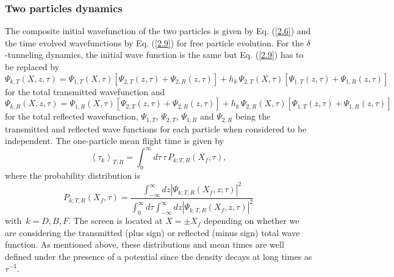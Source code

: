 \documentclass[preprint,aps]{revtex4}
\begin{document}
\subsubsection{Two particles dynamics}

The composite initial wavefunction of the two particles is given by Eq. (\ref{2.6}) and the time evolved wavefunctions by Eq. (\ref{2.9}) for free particle evolution. For the $\delta$-tunneling dynamics, the initial wave function is the same but Eq. (\ref{2.9}) has to be replaced by 
%
\begin{equation}\label{3.34}
\Psi _{k,T}\left( X, z, \tau \right) = \Psi _{1,T}\left( X,\tau \right) \left[\Psi _{2,T}\left(z,\tau \right)+\Psi _{2,R}\left(z,\tau \right)\right] + h_k \, \Psi _{2,T}\left( X,\tau \right)   \left[\Psi _{1,T}\left(z,\tau \right)+\Psi _{1,R}\left(z,\tau \right)\right]  \, 
\end{equation}
%
for the total transmitted wavefunction and
%
\begin{equation}\label{3.35}
	\Psi _{k,R}\left( X, z, \tau \right) = \Psi _{1,R}\left( X,\tau \right) \left[\Psi _{2,T}\left(z,\tau \right)+\Psi _{2,R}\left(z,\tau \right)\right] + h_k \, \Psi _{2,R}\left( X,\tau \right)   \left[\Psi _{1,T}\left(z,\tau \right)+\Psi _{1,R}\left(z,\tau \right)\right] \, 
\end{equation}
%
for the total reflected wavefunction, $ \Psi _{1,T}$, $ \Psi _{2,T}$, $ \Psi _{1,R}$ and $ \Psi _{2,R}$ being the 
transmitted and reflected wave functions for each particle when considered to be independent. The one-particle mean flight time is given by 
%
\begin{equation}
\left\langle \tau_k \right\rangle _{T,R}=\int_{0}^{\infty }d\tau \, \tau \, P_{k;T,R}\left( X_f, \tau \right) ,   \label{3.36}
\end{equation}%
%
where the probability distribution is
%
\begin{equation}
	P_{k;T,R}\left( X_f, \tau \right) =\frac{\int_{-\infty }^{\infty }dz\left\vert \Psi
		_{k;T,R}\left( X_f,z;\tau \right) \right\vert ^{2}}{\int_{0}^{\infty }d\tau
		\int_{-\infty }^{\infty }dz\left\vert \Psi _{k;T,R}\left( X_f,z,\tau \right)
		\right\vert ^{2}}  \label{3.37}
\end{equation}%
with $\, k=D, B, F$. The screen is located at $X=\pm X_f$ depending on whether we are considering the transmitted (plus sign) or reflected (minus sign) total wave function.  As mentioned above,
these distributions and mean times are well defined under the presence of a potential since the density decays at long times
as $\tau ^{-3}$.
\end{document}
